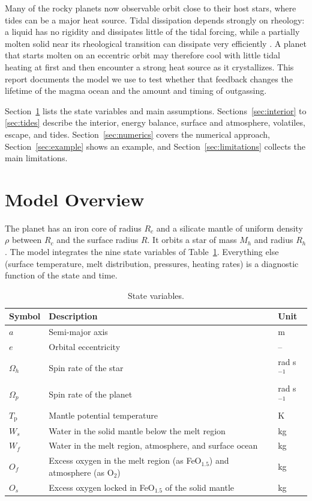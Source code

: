 \documentclass[11pt]{article}
\newcommand{\Tp}{T_\mathrm{p}}
\begin{document}
Many of the rocky planets now observable orbit close to their host stars, where tides can be a major heat source. Tidal dissipation depends strongly on rheology: a liquid has no rigidity and dissipates little of the tidal forcing, while a partially molten solid near its rheological transition can dissipate very efficiently \citep{Moore2003, Henning2009,Renaud2021}. A planet that starts molten on an eccentric orbit may therefore cool with little tidal heating at first and then encounter a strong heat source as it crystallizes. This report documents the model we use to test whether that feedback changes the lifetime of the magma ocean and the amount and timing of outgassing.

Section~\ref{sec:overview} lists the state variables and main assumptions. Sections~\ref{sec:interior} to \ref{sec:tides} describe the interior, energy balance, surface and atmosphere, volatiles, escape, and tides. Section~\ref{sec:numerics} covers the numerical approach, Section~\ref{sec:example} shows an example, and Section~\ref{sec:limitations} collects the main limitations.

\section{Model Overview}\label{sec:overview}

The planet has an iron core of radius $R_c$ and a silicate mantle of uniform density $\rho$ between $R_c$ and the surface radius $R$. It orbits a star of mass $M_h$ and radius $R_h$. The model integrates the nine state variables of Table~\ref{tab:state}. Everything else (surface temperature, melt distribution, pressures, heating rates) is a diagnostic function of the state and time.

\begin{table}[h]
\centering
\caption{State variables.}\label{tab:state}
\begin{tabular}{lll}
\toprule
Symbol & Description & Unit \\
\midrule
$a$ & Semi-major axis & m \\
$e$ & Orbital eccentricity & -- \\
$\Omega_h$ & Spin rate of the star & rad s$^{-1}$ \\
$\Omega_p$ & Spin rate of the planet & rad s$^{-1}$ \\
$\Tp$ & Mantle potential temperature & K \\
$W_s$ & Water in the solid mantle below the melt region & kg \\
$W_f$ & Water in the melt region, atmosphere, and surface ocean & kg \\
$O_f$ & Excess oxygen in the melt region (as FeO$_{1.5}$) and atmosphere (as O$_2$) & kg \\
$O_s$ & Excess oxygen locked in FeO$_{1.5}$ of the solid mantle & kg \\
\bottomrule
\end{tabular}
\end{table}
\end{document}
